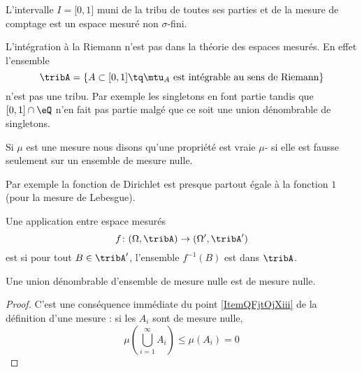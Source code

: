 \begin{example}
    L'intervalle \( I=\mathopen[ 0 , 1 \mathclose]\) muni de la tribu de toutes ses parties et de la mesure de comptage est un espace mesuré non \( \sigma\)-fini.
\end{example}

\begin{example}
    L'intégration à la Riemann n'est pas dans la théorie des espaces mesurés. En effet l'ensemble 
    \begin{equation}
        \tribA=\{   A\subset\mathopen[ 0 , 1 \mathclose]\tq  \text{\( \mtu_A\) est intégrable au sens de Riemann}   \}
    \end{equation}
    n'est pas une tribu. Par exemple les singletons en font partie tandis que \( \mathopen[ 0 , 1 \mathclose]\cap \eQ\) n'en fait pas partie malgé que ce soit une union dénombrable de singletons.
\end{example}

\begin{definition}
    Si \( \mu\) est une mesure nous disons qu'une propriété est vraie \( \mu\)- si elle est fausse seulement sur un ensemble de mesure nulle.
\end{definition}

Par exemple la fonction de Dirichlet est presque partout égale à la fonction \( 1\) (pour la mesure de Lebesgue).

\begin{definition}
    Une application entre espace mesurés
    \begin{equation}
        f\colon (\Omega,\tribA)\to (\Omega',\tribA')
    \end{equation}
    est  si pour tout \( B\in\tribA'\), l'ensemble \( f^{-1}(B)\) est dans \( \tribA\).
\end{definition}

\begin{lemma}   \label{LemIDITgAy}
    Une union dénombrable d'ensemble de mesure nulle est de mesure nulle.
\end{lemma}

\begin{proof}
    C'est une conséquence immédiate du point \ref{ItemQFjtOjXiii} de la définition d'une mesure : si les \( A_i\) sont de mesure nulle,
    \begin{equation}
        \mu\left( \bigcup_{i=1}^{\infty}A_i \right)\leq \mu(A_i)=0
    \end{equation}
\end{proof}

